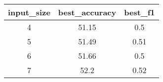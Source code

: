 \begin{tabular}{ccc}
	input\_size & best\_accuracy & best\_f1 \\\hline\hline
	4           & 51.15          & 0.5      \\
	5           & 51.49          & 0.51     \\
	6           & 51.66          & 0.5      \\
	7           & 52.2           & 0.52     \\
\end{tabular}